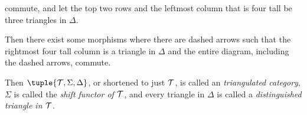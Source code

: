 \begin{definition}
\begin{enumerate}[label={(\bfseries T\arabic*)}]
{\begin{center}
            \end{center}
            commute, and let the top two rows and the leftmost column that is four tall be three triangles in \( \Delta \).

            Then there exist some morphisms where there are dashed arrows such that the rightmost four tall column is a triangle in \( \Delta \) and the entire diagram, including the dashed arrows, commute.
        }
    \end{enumerate}

    Then \( \tuple{ \Tc, \Sigma, \Delta } \), or shortened to just \( {\mathcal{T}} \), is called an \emph{triangulated category}, \( \Sigma \) is called the \emph{shift functor of \( {\mathcal{T}} \)}, and every triangle in \( \Delta \) is called a \emph{distinguished triangle in \( {\mathcal{T}} \)}.
\end{definition}